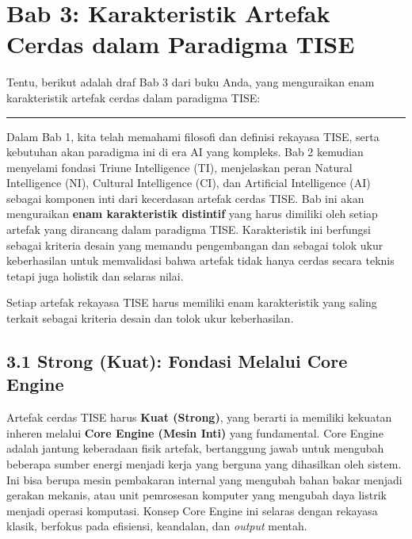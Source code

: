 \documentclass[
  letterpaper,
  DIV=11,
  numbers=noendperiod]{scrreprt}
\begin{document}

\chapter{\texorpdfstring{\textbf{Bab 3: Karakteristik Artefak Cerdas
dalam Paradigma
TISE}}{Bab 3: Karakteristik Artefak Cerdas dalam Paradigma TISE}}\label{bab-3-karakteristik-artefak-cerdas-dalam-paradigma-tise}

Tentu, berikut adalah draf Bab 3 dari buku Anda, yang menguraikan enam
karakteristik artefak cerdas dalam paradigma TISE:

\begin{center}\rule{0.5\linewidth}{0.5pt}\end{center}

Dalam Bab 1, kita telah memahami filosofi dan definisi rekayasa TISE,
serta kebutuhan akan paradigma ini di era AI yang kompleks. Bab 2
kemudian menyelami fondasi Triune Intelligence (TI), menjelaskan peran
Natural Intelligence (NI), Cultural Intelligence (CI), dan Artificial
Intelligence (AI) sebagai komponen inti dari kecerdasan artefak cerdas
TISE. Bab ini akan menguraikan \textbf{enam karakteristik distintif}
yang harus dimiliki oleh setiap artefak yang dirancang dalam paradigma
TISE. Karakteristik ini berfungsi sebagai kriteria desain yang memandu
pengembangan dan sebagai tolok ukur keberhasilan untuk memvalidasi bahwa
artefak tidak hanya cerdas secara teknis tetapi juga holistik dan
selaras nilai.

Setiap artefak rekayasa TISE harus memiliki enam karakteristik yang
saling terkait sebagai kriteria desain dan tolok ukur keberhasilan.

\section{\texorpdfstring{\textbf{3.1 Strong (Kuat): Fondasi Melalui Core
Engine}}{3.1 Strong (Kuat): Fondasi Melalui Core Engine}}\label{strong-kuat-fondasi-melalui-core-engine}

Artefak cerdas TISE harus \textbf{Kuat (Strong)}, yang berarti ia
memiliki kekuatan inheren melalui \textbf{Core Engine (Mesin Inti)} yang
fundamental. Core Engine adalah jantung keberadaan fisik artefak,
bertanggung jawab untuk mengubah beberapa sumber energi menjadi kerja
yang berguna yang dihasilkan oleh sistem. Ini bisa berupa mesin
pembakaran internal yang mengubah bahan bakar menjadi gerakan mekanis,
atau unit pemrosesan komputer yang mengubah daya listrik menjadi operasi
komputasi. Konsep Core Engine ini selaras dengan rekayasa klasik,
berfokus pada efisiensi, keandalan, dan \emph{output} mentah.
\end{document}
